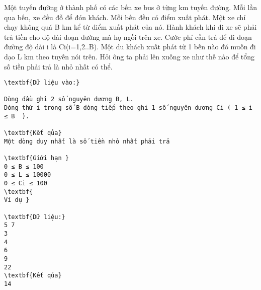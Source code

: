 

Một tuyến đường ở thành phố có các bến xe bus ở từng km tuyến đường. Mỗi lần qua bến, xe đều đỗ để đón khách. Mỗi bến đều có điểm xuất phát. Một xe chỉ chạy không quá B km kể từ điểm xuất phát của nó. Hành khách khi đi xe sẽ phải trả tiền cho độ dài đoạn đường mà họ ngồi trên xe. Cước phí cần trả để đi đoạn đường độ dài i là Ci(i=1,2..B). Một du khách xuất phát từ 1 bến nào đó muốn đi dạo L km theo tuyến nói trên. Hỏi ông ta phải lên xuống xe như thế nào để tổng số tiền phải trả là nhỏ nhất có thể.
\begin{verbatim}
\textbf{Dữ liệu vào:}

Dòng đầu ghi 2 số nguyên dương B, L.
Dòng thứ i trong số B dòng tiếp theo ghi 1 số nguyên dương Ci ( 1 ≤ i ≤ B  ).

\textbf{Kết qủa}
Một dòng duy nhất là số tiền nhỏ nhất phải trả

\textbf{Giới hạn }
0 ≤ B ≤ 100
0 ≤ L ≤ 10000
0 ≤ Ci ≤ 100 
\textbf{
Ví dụ }

\textbf{Dữ liệu:}
5 7
3 
4
6
9
22
\textbf{Kết qủa}
14
\end{verbatim}
